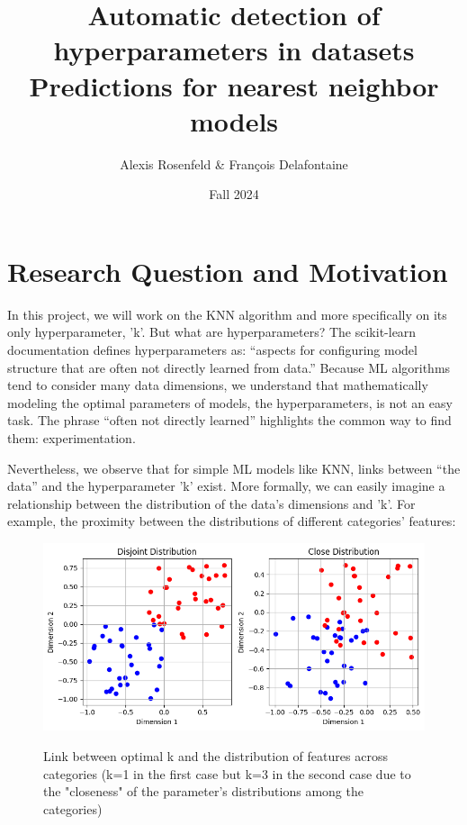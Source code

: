 \documentclass{article}
\title{Automatic detection of hyperparameters in datasets \\
       \large Predictions for nearest neighbor models}
\author{Alexis Rosenfeld \& François Delafontaine}
\date{Fall 2024}
\begin{document}
\maketitle

\section{Research Question and Motivation}
In this project, we will work on the KNN algorithm and more specifically on its only hyperparameter, 'k'. But what are hyperparameters? The scikit-learn documentation defines hyperparameters as: “aspects for configuring model structure that are often not directly learned from data.” Because ML algorithms tend to consider many data dimensions, we understand that mathematically modeling the optimal parameters of models, the hyperparameters, is not an easy task. The phrase “often not directly learned” highlights the common way to find them: experimentation.

Nevertheless, we observe that for simple ML models like KNN, links between “the data” and the hyperparameter 'k' exist. More formally, we can easily imagine a relationship between the distribution of the data's dimensions and 'k'. For example, the proximity between the distributions of different categories' features:

\begin{figure}[H]
	\centering
	\includegraphics[scale=0.45]{Img/il1.png}
	\label{fig:csehr}
    \caption{Link between optimal k and the distribution of features across categories (k=1 in the first case but k=3 in the second case due to the "closeness" of the parameter's distributions among the categories)}
\end{figure}
\end{document}

